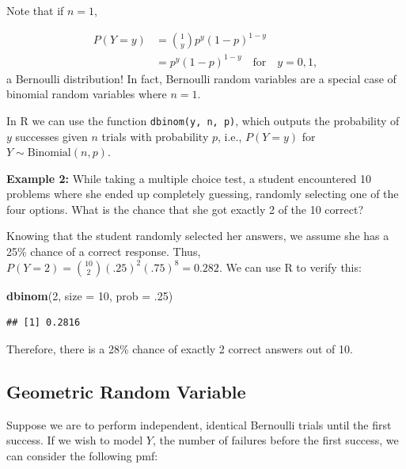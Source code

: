 \documentclass[
]{krantz}
\newenvironment{Shaded}{\begin{snugshade}}{\end{snugshade}}
\newcommand{\DataTypeTok}[1]{\textcolor[rgb]{0.27,0.27,0.27}{#1}}
\newcommand{\DecValTok}[1]{\textcolor[rgb]{0.06,0.06,0.06}{#1}}
\newcommand{\FloatTok}[1]{\textcolor[rgb]{0.06,0.06,0.06}{#1}}
\newcommand{\KeywordTok}[1]{\textcolor[rgb]{0.27,0.27,0.27}{\textbf{#1}}}
\newcommand{\NormalTok}[1]{#1}
\begin{document}
\vspace{2cm}

Note that if \(n=1\),

\begin{align*}
 P(Y=y) &= \binom{1}{y} p^y(1-p)^{1-y} \\
        &= p^y(1-p)^{1-y}\quad \textrm{for}\quad y = 0, 1,
\end{align*}
a Bernoulli distribution! In fact, Bernoulli random variables are a special case of binomial random variables where \(n=1\).

In R we can use the function \texttt{dbinom(y,\ n,\ p)}, which outputs the probability of \(y\) successes given \(n\) trials with probability \(p\), i.e., \(P(Y=y)\) for \(Y \sim \textrm{Binomial}(n,p)\).

\textbf{Example 2:} While taking a multiple choice test, a student encountered 10 problems where she ended up completely guessing, randomly selecting one of the four options. What is the chance that she got exactly 2 of the 10 correct?

Knowing that the student randomly selected her answers, we assume she has a 25\% chance of a correct response. Thus, \(P(Y=2) = {10 \choose 2}(.25)^2(.75)^8 = 0.282\). We can use R to verify this:

\begin{Shaded}
\begin{Highlighting}[]
\KeywordTok{dbinom}\NormalTok{(}\DecValTok{2}\NormalTok{, }\DataTypeTok{size =} \DecValTok{10}\NormalTok{, }\DataTypeTok{prob =} \FloatTok{.25}\NormalTok{)}
\end{Highlighting}
\end{Shaded}

\begin{verbatim}
## [1] 0.2816
\end{verbatim}

Therefore, there is a 28\% chance of exactly 2 correct answers out of 10.

\hypertarget{geometric-random-variable}{%
\subsection{Geometric Random Variable}\label{geometric-random-variable}}

Suppose we are to perform independent, identical Bernoulli trials until the first success. If we wish to model \(Y\), the number of failures before the first success, we can consider the following pmf:
\end{document}
